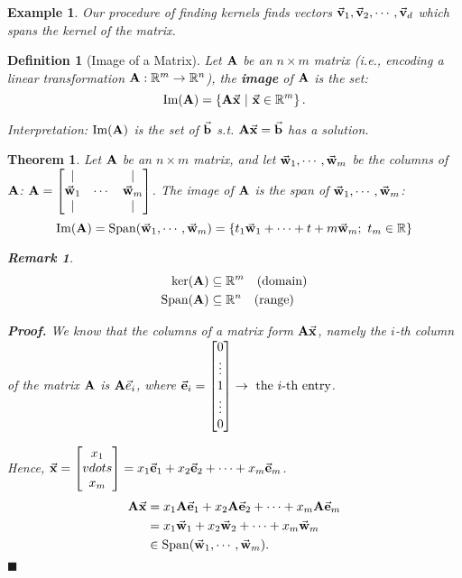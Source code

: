 \documentclass[12pt, a4paper]{article}
\newtheorem{thm}{Theorem}[subsection]
\newtheorem{df}{Definition}[subsection]
\newtheorem{eg}{Example}[subsection]
\newtheorem*{rmk}{\indent Remark}
\newenvironment*{prf}{\par\indent\textbf{\textit{Proof. }}}{\hfill $\blacksquare$\par}
\def\R{{\mathbb{R}}}
\def\IM{{\mathrm{Im}}}
\def\Span{\mathrm{Span}}
\def\vecx{\va{x}}
\def\vecv{\va{v}}
\def\vecw{\va{w}}
\def\vecb{\va{b}}
\def\vece{\va{e}}
\def\matrixA{\vb{A}}
\begin{document}
\begin{eg}
	Our procedure of finding kernels finds vectors $\vecv_1,\vecv_2,\cdots,\vecv_d$ which spans the kernel of the matrix.	
\end{eg}
\begin{df}[Image of a Matrix]
	Let $\matrixA$ be an $n\times m$ matrix (i.e., encoding a linear transformation $\matrixA:\R^m\to\R^n$), the \textbf{image} of $\matrixA$	 is the set: 
	\[\IM(\matrixA)=\left\{\matrixA\vecx\ |\ \vecx\in\R^m\right\}.\]
	
	Interpretation: $\IM(\matrixA)$ is the set of $\vecb$ \emph{s.t.} $\matrixA\vecx=\vecb$ has a solution.
\end{df}
\begin{thm}
	Let $\matrixA$ be an $n\times m$ matrix, and let	 $\vecw_1,\cdots,\vecw_m$ be the columns of $\matrixA$: $\matrixA=\begin{bmatrix}|&&|\\\vecw_1&\cdots&\vecw_m\\|&&|\end{bmatrix}$. The image of $\matrixA$ is the span of $\vecw_1,\cdots,\vecw_m$: 
	\[\IM(\matrixA)=\Span(\vecw_1,\cdots,\vecw_m)=\left\{t_1\vecw_1+\cdots+t+m\vecw_m;\ t_m\in\R\right\}\]
	\begin{rmk}
		\[\begin{aligned}\ker(\matrixA)&\subseteq\R^m\quad\text{(domain)}\\\Span(\matrixA)&\subseteq\R^n\quad\text{(range)}\end{aligned}\]	
	\end{rmk}
	\begin{prf}
		We know that the columns of a matrix form $\matrixA\vecx$, namely the $i$-th column of the matrix $\matrixA$ is $\matrixA\vec{e}_i$, where $\vece_i=\begin{bmatrix}0\\\vdots\\1\\\vdots\\0\end{bmatrix} \rightarrow \ \text{the }i\text{-th entry}$.
		
		Hence, $\vecx=\begin{bmatrix}x_1\\vdots\\x_m\end{bmatrix}=x_1\vece_1+x_2\vece_2+\cdots+x_m\vece_m$.
		$$\begin{aligned}
			\matrixA\vecx&=x_1\matrixA\vece_1+x_2\matrixA\vece_2+\cdots+x_m\matrixA\vece_m\\
			&=x_1\vecw_1+x_2\vecw_2+\cdots+x_m\vecw_m\\
			&\in\Span(\vecw_1,\cdots,\vecw_m).
		\end{aligned}$$
	\end{prf}
\end{thm}
\end{document}
